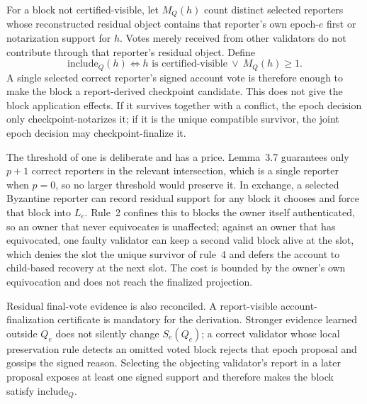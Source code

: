 \documentclass[10pt,twocolumn]{article}
\newcommand{\Include}{\mathrm{include}}
\begin{document}
For a block not certified-visible, let $M_Q(h)$ count distinct selected reporters whose reconstructed residual object contains that reporter's own epoch-$e$ first or notarization support for $h$. Votes merely received from other validators do not contribute through that reporter's residual object. Define
\begin{equation}
\Include_Q(h) \Longleftrightarrow h\text{ is certified-visible}\ \lor\ M_Q(h)\ge 1.
\end{equation}
A single selected correct reporter's signed account vote is therefore enough to make the block a report-derived checkpoint candidate. This does not give the block application effects. If it survives together with a conflict, the epoch decision only checkpoint-notarizes it; if it is the unique compatible survivor, the joint epoch decision may checkpoint-finalize it.

The threshold of one is deliberate and has a price. Lemma~3.7 guarantees only $p+1$ correct reporters in the relevant intersection, which is a single reporter when $p=0$, so no larger threshold would preserve it. In exchange, a selected Byzantine reporter can record residual support for any block it chooses and force that block into $L_e$. Rule~2 confines this to blocks the owner itself authenticated, so an owner that never equivocates is unaffected; against an owner that has equivocated, one faulty validator can keep a second valid block alive at the slot, which denies the slot the unique survivor of rule~4 and defers the account to child-based recovery at the next slot. The cost is bounded by the owner's own equivocation and does not reach the finalized projection.

Residual final-vote evidence is also reconciled. A report-visible account-finalization certificate is mandatory for the derivation. Stronger evidence learned outside $Q_e$ does not silently change $S_e(Q_e)$; a correct validator whose local preservation rule detects an omitted voted block rejects that epoch proposal and gossips the signed reason. Selecting the objecting validator's report in a later proposal exposes at least one signed support and therefore makes the block satisfy $\Include_Q$.
\end{document}
